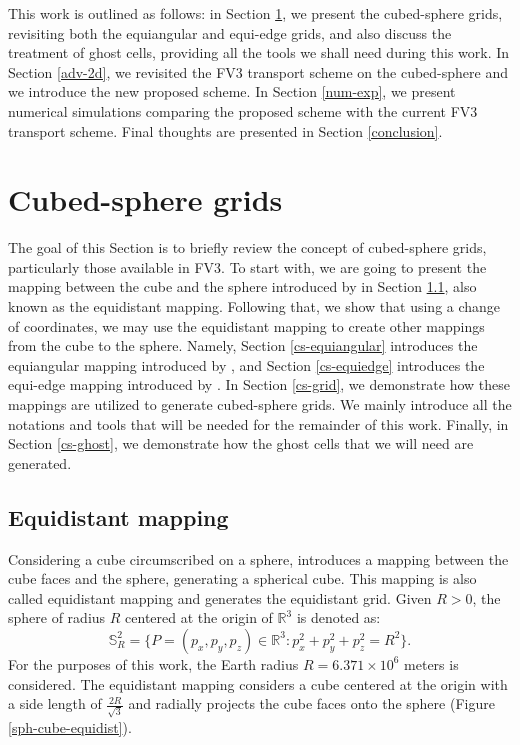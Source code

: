 \documentclass[preprint,12pt]{elsarticle}
\begin{document}
\begin{linenumbers}
This work is outlined as follows:
in Section \ref{cs-grids}, we present the cubed-sphere grids, revisiting both the equiangular and equi-edge grids, and also discuss the treatment of ghost cells, providing all the tools we shall need during this work.
In Section \ref{adv-2d}, we revisited the FV3 transport scheme on the cubed-sphere and we introduce the new proposed scheme.
In Section \ref{num-exp}, we present numerical simulations comparing the proposed scheme with the current FV3 transport scheme. 
Final thoughts are presented in Section \ref{conclusion}.

\newpage
\section{Cubed-sphere grids}
\label{cs-grids}
The goal of this Section is to briefly review the concept of cubed-sphere grids, particularly those available in FV3.
To start with, we are going to present the mapping between the cube and the sphere introduced by \cite{sadourny:1972} in Section \ref{cs-equidistant}, also known as the equidistant mapping.
Following that, we show that using a change of coordinates, we may use the equidistant mapping to create other mappings from the cube to the sphere.
Namely, Section \ref{cs-equiangular} introduces the equiangular mapping introduced by \cite{ronchi:1996}, and Section \ref{cs-equiedge} introduces the equi-edge mapping introduced by \cite{chen:2021}. 
In Section \ref{cs-grid}, we demonstrate how these mappings are utilized to generate cubed-sphere grids. 
We mainly introduce all the notations and tools that will be needed for the remainder of this work.
Finally, in Section \ref{cs-ghost}, we demonstrate how the ghost cells that we will need are generated.

\subsection{Equidistant mapping}
\label{cs-equidistant}
Considering a cube circumscribed on a sphere, \cite{sadourny:1972} introduces a mapping between the cube faces and the sphere, generating a spherical cube.
This mapping is also called equidistant mapping and generates the equidistant grid.
Given $R>0$, the sphere of radius $R$ 
centered at the origin of  $\mathbb{R}^3$ is denoted as:
\begin{equation}
	\label{s2_r}
	\mathbb{S}^2_R = \{ P = (p_x,p_y,p_z) \in \mathbb{R}^3: p_x^2 + p_y^2 + p_z^2 = R^2\}.
\end{equation}
For the purposes of this work, the Earth radius $R=6.371\times 10^6$ meters is considered.
The equidistant mapping considers a cube centered at the origin with a side length of $\frac{2R}{\sqrt{3}}$ and radially projects the cube faces onto the sphere (Figure \ref{sph-cube-equidist}).


\end{linenumbers}
\end{document}
